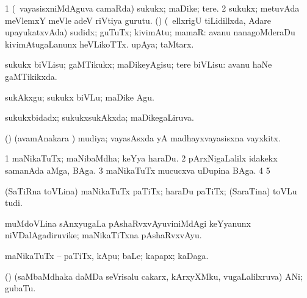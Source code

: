 {{{{{{\begin{center}
{{\bentry
{} 
\gl{\nA}
\expl{}
\bmng
\bnum
\num{1} (\sA\ vayasisxniMdAguva camaRda) sukukx; maDike; tere. 
\num{2} sukukx; metuvAda meVlemxY meVle adeV riVtiya gurutu. 
 (\AmA) 
\banum
{} (\sA\ ellxrigU tiLidillxda, Adare upayukatxvAda) sudidx; guTuTx; kivimAtu; mamaR:  avanu nanagoMderaDu kivimAtugaLanunx heVLikoTTx. 
 upAya; taMtarx. 
\eanum
\numie
\enum
\emng
\eentry

\bentry
{} 
\gl{\sakirx}
\expl{}
\bmng
sukukx biVLisu; gaMTikukx; maDikeyAgisu; tere biVLisu:  avanu haNe gaMTikikxda. 
\emng

\noindent
\gl{\akirx}
\expl{}
\bmng
sukAkxgu; sukukx biVLu; maDike Agu. 
\emng
\eentry

\bentry
{} 
\gl{\nA}
\expl{}
\bmng
{} 
\emng
\eentry

\bentry 
{} 
\gl{\gu}
\bmng
sukukxbidadx; sukukxsukAkxda; maDikegaLiruva. 
\emng
\eentry

\bentry 
{} 
\gl{\nA}
\bmng
(\ashi) (avamAnakara \parx) mudiya; vayasAsxda yA madhayxvayasisxna vayxkitx. 
\emng
\eentry

\bentry
{} 
\gl{\nA}
\expl{}
\bmng
\bnum
\num{1} maNikaTuTx; maNibaMdha; keYya haraDu. 
\num{2} pArxNigaLalilx idakekx samanAda aMga, BAga. 
\num{3} maNikaTuTx mucucxva uDupina BAga. 
\num{4}  
\num{5}  
\enum
\emng
\eentry

\bentry
{} 
\gl{\nA}
\expl{}
\bmng
(SaTiRna toVLina) maNikaTuTx paTiTx; haraDu paTiTx; (SaraTina) toVLu tudi. 
\emng
\eentry

\bentry
{} 
\gl{\nA}
\expl{}
\bmng
muMdoVLina sAnxyugaLa pAshaRvxvAyuviniMdAgi keYyanunx niVDalAgadiruvike; maNikaTiTxna pAshaRvxvAyu. 
\emng
\eentry

\bentry
{} 
\gl{\nA}
\expl{}
\bmng
maNikaTuTx -- paTiTx, kApu; baLe; kapapx; kaDaga. 
\emng
\eentry

\bentry
{} 
\gl{\nA}
\expl{}
\bmng
(\yaMshA) (saMbaMdhaka daMDa seVrisalu cakarx, kArxyXMku, \mo vugaLalilxruva) ANi; gubaTu. 
\emng
\eentry

}}
\end{center}}}}}}}
